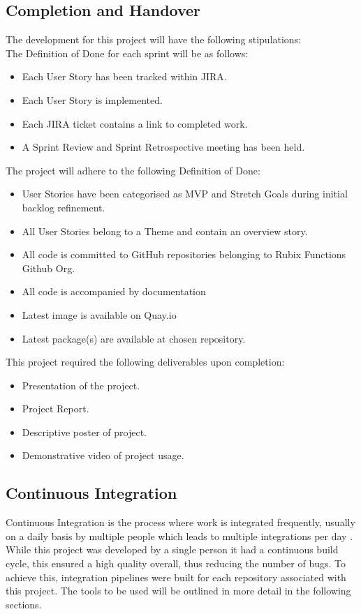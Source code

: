 \subsection{Completion and Handover}
\label{sub:dod}
The development for this project will have the following stipulations:
\\The Definition of Done for each sprint will be as follows:
\begin{itemize}
    \item Each User Story has been tracked within JIRA.
    \item Each User Story is implemented.
    \item Each JIRA ticket contains a link to completed work.
    \item A Sprint Review and Sprint Retrospective meeting has been held.
\end{itemize}
The project will adhere to the following Definition of Done:
\begin{itemize}
    \item User Stories have been categorised as MVP and Stretch Goals during initial backlog refinement.
    \item All User Stories belong to a Theme and contain an overview story.
    \item All code is committed to GitHub repositories belonging to Rubix Functions Github Org.
    \item All code is accompanied by documentation
    \item Latest image is available on Quay.io
    \item Latest package(s) are available at chosen repository. 
\end{itemize}
This project required the following deliverables upon completion:
\begin{itemize}
    \item Presentation of the project.
    \item Project Report.
    \item Descriptive poster of project.
    \item Demonstrative video of project usage.
\end{itemize}





\subsection{Continuous Integration}
Continuous Integration is the process where work is integrated frequently, usually on a daily basis by multiple people which leads to multiple integrations per day \citep{fowler_2006}. While this project was developed by a single person it had a continuous build cycle, this ensured a high quality overall, thus reducing the number of bugs. To achieve this, integration pipelines were built for each repository associated with this project. The tools to be used will be outlined in more detail in the following sections. 

